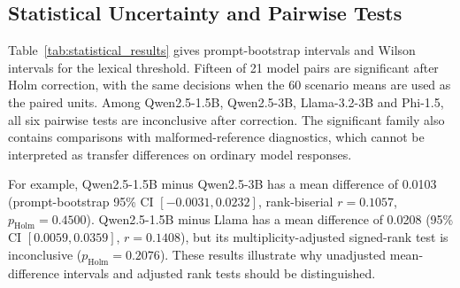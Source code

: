 \documentclass[electronics,article,submit,pdftex,moreauthors]{Definitions/mdpi}
\begin{document}
\begin{table}[ht]
\centering
\caption{EOS subsets of the archived-reference cohort ($N=300$ per model; validated length inputs, all segments, 80-token T5 input and output limits). EOS-only metrics select \texttt{response\_complete} samples; they do not certify correct reconstructions. Both LR columns report percentages. Phi-3.5-mini and TinyLlama remain reference-format diagnostics.}
\label{tab:eos_completeness}
\end{table}

\subsection{Statistical Uncertainty and Pairwise Tests}
Table~\ref{tab:statistical_results} gives prompt-bootstrap intervals and Wilson intervals for the lexical threshold. Fifteen of 21 model pairs are significant after Holm correction, with the same decisions when the 60 scenario means are used as the paired units. Among Qwen2.5-1.5B, Qwen2.5-3B, Llama-3.2-3B and Phi-1.5, all six pairwise tests are inconclusive after correction. The significant family also contains comparisons with malformed-reference diagnostics, which cannot be interpreted as transfer differences on ordinary model responses.

For example, Qwen2.5-1.5B minus Qwen2.5-3B has a mean difference of 0.0103 (prompt-bootstrap 95\% CI $[-0.0031,0.0232]$, rank-biserial $r=0.1057$, $p_{\mathrm{Holm}}=0.4500$). Qwen2.5-1.5B minus Llama has a mean difference of 0.0208 (95\% CI $[0.0059,0.0359]$, $r=0.1408$), but its multiplicity-adjusted signed-rank test is inconclusive ($p_{\mathrm{Holm}}=0.2076$). These results illustrate why unadjusted mean-difference intervals and adjusted rank tests should be distinguished.
\end{document}
